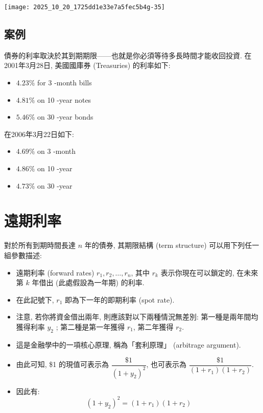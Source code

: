\documentclass[letterpaper]{article}
\begin{document}
		\texttt{[image: 2025\_10\_20\_1725dd1e33e7a5fec5b4g-35]}
		
		\subsection{案例}
		債券的利率取決於其到期期限——也就是你必須等待多長時間才能收回投資.  在 2001年3月28日, 美國國庫券 (Treasuries) 的利率如下: 
		
		
		\begin{itemize}
			\item $4.23 \%$ for 3 -month bills
			\item $4.81 \%$ on 10 -year notes
			\item $5.46 \%$ on 30 -year bonds
		\end{itemize}
		
		在2006年3月22日如下: 
		
		\begin{itemize}
			\item $4.69 \%$ on 3 -month
			\item $4.86 \%$ on 10 -year
			\item $4.73 \%$ on 30 -year
		\end{itemize}
		
		
		\section{遠期利率}
		對於所有到期時間長達 \( n \) 年的債券, 其期限結構 (term structure) 可以用下列任一組參數描述: 
		
		\begin{itemize}
			\item 遠期利率 (forward rates) \( r_{1}, r_{2}, \ldots, r_{n} \), 其中 \( r_{k} \) 表示你現在可以鎖定的, 在未來第 \( k \) 年借出 (此處假設為一年期) 的利率.  
			\item 在此記號下, \( r_{1} \) 即為下一年的即期利率 (spot rate).  
			\item 注意, 若你將資金借出兩年, 則應該對以下兩種情況無差別:   
			第一種是兩年間均獲得利率 \( y_{2} \) ;   
			第二種是第一年獲得 \( r_{1} \), 第二年獲得 \( r_{2} \).  
			\item 這是金融學中的一項核心原理, 稱為「套利原理」 (arbitrage argument).  
			\item 由此可知, \$1 的現值可表示為 \(\dfrac{\$1}{ (1 + y_{2}) ^{2}}\), 也可表示為 \(\dfrac{\$1}{ (1 + r_{1})  (1 + r_{2}) }\).  
			\item 因此有: 
			\[
			(1 + y_{2}) ^{2} =  (1 + r_{1})  (1 + r_{2}) 
			\]
		\end{itemize}
		
\end{document}
